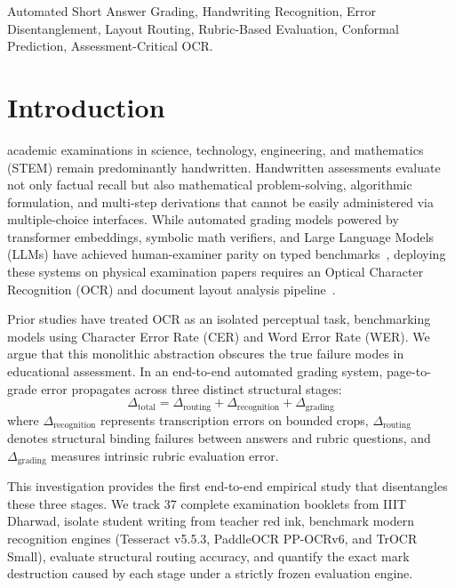 \documentclass[journal]{IEEEtran}
\begin{document}
\begin{IEEEkeywords}
Automated Short Answer Grading, Handwriting Recognition, Error Disentanglement, Layout Routing, Rubric-Based Evaluation, Conformal Prediction, Assessment-Critical OCR.
\end{IEEEkeywords}

\section{Introduction}
 academic examinations in science, technology, engineering, and mathematics (STEM) remain predominantly handwritten. Handwritten assessments evaluate not only factual recall but also mathematical problem-solving, algorithmic formulation, and multi-step derivations that cannot be easily administered via multiple-choice interfaces. While automated grading models powered by transformer embeddings, symbolic math verifiers, and Large Language Models (LLMs) have achieved human-examiner parity on typed benchmarks~\cite{burrows2015erasag, reimers2019sentencebert}, deploying these systems on physical examination papers requires an Optical Character Recognition (OCR) and document layout analysis pipeline~\cite{smith2007overview, du2020ppocr, li2023trocr}.

Prior studies have treated OCR as an isolated perceptual task, benchmarking models using Character Error Rate (CER) and Word Error Rate (WER). We argue that this monolithic abstraction obscures the true failure modes in educational assessment. In an end-to-end automated grading system, page-to-grade error propagates across three distinct structural stages:
\begin{equation}
\Delta_{\text{total}} = \Delta_{\text{routing}} + \Delta_{\text{recognition}} + \Delta_{\text{grading}}
\end{equation}
where $\Delta_{\text{recognition}}$ represents transcription errors on bounded crops, $\Delta_{\text{routing}}$ denotes structural binding failures between answers and rubric questions, and $\Delta_{\text{grading}}$ measures intrinsic rubric evaluation error.

This investigation provides the first end-to-end empirical study that disentangles these three stages. We track 37 complete examination booklets from IIIT Dharwad, isolate student writing from teacher red ink, benchmark modern recognition engines (Tesseract v5.5.3, PaddleOCR PP-OCRv6, and TrOCR Small), evaluate structural routing accuracy, and quantify the exact mark destruction caused by each stage under a strictly frozen evaluation engine.
\end{document}
